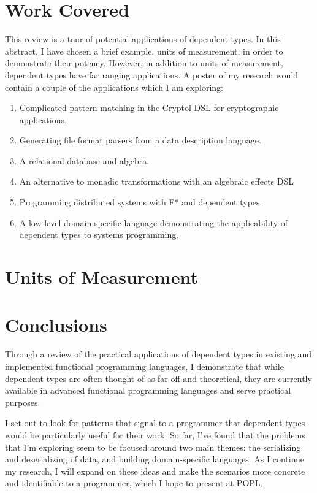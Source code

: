 \section{Work Covered}
This review is a tour of potential applications of dependent types. In this
abstract, I have chosen a brief example, units of measurement, in order to
demonstrate their potency. However, in addition to units of measurement,
dependent types have far ranging applications. A poster of my research would
contain a couple of the applications which I am exploring: 
\begin{enumerate}
  \item Complicated pattern matching in the Cryptol DSL for cryptographic
  applications. \cite{power_of_pi}
  \item Generating file format parsers from a data description language.
  \cite{power_of_pi}
  \item A relational database and algebra. \cite{power_of_pi, eisenberg2016}
  \item An alternative to monadic transformations with an algebraic effects DSL
  \cite{algebraic}
  \item Programming distributed systems with F* and dependent types.
  \cite{fstar_distributed_programming}
  \item A low-level domain-specific language demonstrating the applicability of
  dependent types to systems programming. \cite{idris_systems_programming}
\end{enumerate}

\section{Units of Measurement}


\section{Conclusions}
Through a review of the practical applications of dependent types in existing
and implemented functional programming languages, I demonstrate that while
dependent types are often thought of as far-off and theoretical, they are
currently available in advanced functional programming languages and serve
practical purposes. 

I set out to look for patterns that signal to a programmer that dependent types
would be particularly useful for their work. So far, I've found that the
problems that I'm exploring seem to be focused around two main themes: the
serializing and deserializing of data, and building domain-specific languages.
As I continue my research, I will expand on these ideas and make the scenarios
more concrete and identifiable to a programmer, which I hope to present at POPL.